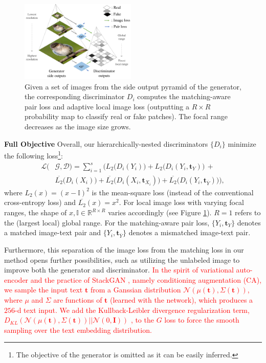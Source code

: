 \documentclass[10pt,twocolumn,letterpaper]{article}
\begin{document}
\begin{figure}[t]
	\centering
	\includegraphics[width=0.49\textwidth]{figure/loss.pdf}
	\vspace{-.7cm}
	\caption{Given a set of images from the side output pyramid of the generator, the corresponding discriminator $D_i$ computes the matching-aware pair loss and adaptive local image loss (outputting a $R{\times}R$ probability map to classify real or fake patches). The focal range decreases as the image size grows. }  \vspace{-.3cm}
	\label{fig:loss}
\end{figure}


\textbf{Full Objective } Overall, our hierarchically-nested discriminators $\{D_i\}$ minimize the following loss\footnote{The objective of the generator is omitted as it can be easily inferred.}:
\vspace{-.2cm}
\begin{equation}
\begin{split}
\mathcal{L}(& \mathcal{G}, \mathcal{D})  = \sum_{i=1}^{s} \Big(  L_2\big(D_i({Y}_i)\big) +  L_2\big(D_i({Y}_i, \bm t_{Y})\big) \, + \\ 
& \overline{L_2}\big(D_i({X}_i)\big)  + \overline{L_2}\big(D_i({X}_i, \bm{t}_{X_i})\big) + \overline{L_2}\big(D_i({Y}_i,  \bm{t}_{\overline{Y}})\big) \Big),
\end{split}
\end{equation}
where $L_2(x) = (x - \mathbb{I})^2$ is the mean-square loss (instead of the conventional cross-entropy loss) and $\overline{L_2}(x) =x^2$. For local image loss with varying focal ranges, the shape of $x, \mathbb{I} \in \mathbb{R}^{R{\times}R}$ varies accordingly (see Figure \ref{fig:loss}). $R=1$ refers to the (largest local) global range. For the matching-aware pair loss, 
$\{Y_i, \bm t_{Y}\}$ denotes a matched image-text pair and $\{Y_i, \bm{t}_{\overline{Y}}\}$ denotes a mismatched image-text pair.

Furthermore, this separation of the image loss from the matching loss in our method opens further possibilities, such as utilizing the unlabeled image to improve both the generator and discriminator.
\textcolor{red}{In the spirit of variational auto-encoder \cite{vae} and the practice of StackGAN \cite{han2017stackgan}, namely conditioning augmentation (CA), we sample the input text $\bm t$ from a Ganssian distribution $\mathcal{N}(\mu({\bm t}), \Sigma({\bm t}))$, where $\mu$ and $\Sigma$ are functions of $\bm t$ (learned with the network), which produces a $256$-d text input.
We add the Kullback-Leibler divergence regularization term, $D_{KL}(\mathcal{N}(\mu({\bm t}), \Sigma({\bm t}) )|| \mathcal{N}(0, \bm{I}))$ \cite{vae}, to the $G$ loss to force the smooth sampling over the text embedding distribution. }
\end{document}
